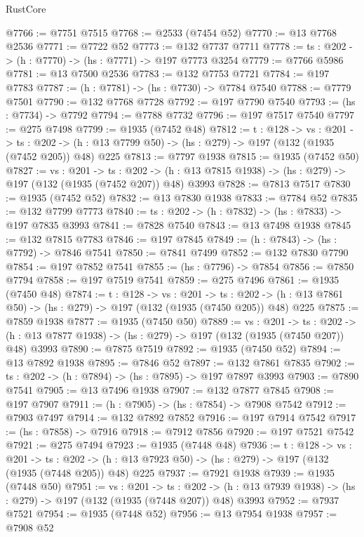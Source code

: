 \begin{lexlean}{RustCore}
\begin{coremodule}
@7766 := @7751 @7515
@7768 := @2533 (@7454 @52)
@7770 := @13 @7768 @2536
@7771 := @7722 @52
@7773 := @132 @7737 @7711
@7778 := {ts : @202} -> (h : @7770) -> (hs : @7771) -> @197 @7773 @3254
@7779 := @7766 @5986
@7781 := @13 @7500 @2536
@7783 := @132 @7753 @7721
@7784 := @197 @7783
@7787 := (h : @7781) -> (hs : @7730) -> @7784 @7540
@7788 := @7779 @7501
@7790 := @132 @7768 @7728
@7792 := @197 @7790 @7540
@7793 := (hs : @7734) -> @7792
@7794 := @7788 @7732
@7796 := @197 @7517 @7540
@7797 := @275 @7498
@7799 := @1935 (@7452 @48)
@7812 := {t : @128} ->
  {vs : @201} ->
  {ts : @202} -> (h : @13 @7799 @50) -> (hs : @279) -> @197 (@132 (@1935 (@7452 @205)) @48) @225
@7813 := @7797 @1938
@7815 := @1935 (@7452 @50)
@7827 := {vs : @201} ->
  {ts : @202} -> (h : @13 @7815 @1938) -> (hs : @279) -> @197 (@132 (@1935 (@7452 @207)) @48) @3993
@7828 := @7813 @7517
@7830 := @1935 (@7452 @52)
@7832 := @13 @7830 @1938
@7833 := @7784 @52
@7835 := @132 @7799 @7773
@7840 := {ts : @202} -> (h : @7832) -> (hs : @7833) -> @197 @7835 @3993
@7841 := @7828 @7540
@7843 := @13 @7498 @1938
@7845 := @132 @7815 @7783
@7846 := @197 @7845
@7849 := (h : @7843) -> (hs : @7792) -> @7846 @7541
@7850 := @7841 @7499
@7852 := @132 @7830 @7790
@7854 := @197 @7852 @7541
@7855 := (hs : @7796) -> @7854
@7856 := @7850 @7794
@7858 := @197 @7519 @7541
@7859 := @275 @7496
@7861 := @1935 (@7450 @48)
@7874 := {t : @128} ->
  {vs : @201} ->
  {ts : @202} -> (h : @13 @7861 @50) -> (hs : @279) -> @197 (@132 (@1935 (@7450 @205)) @48) @225
@7875 := @7859 @1938
@7877 := @1935 (@7450 @50)
@7889 := {vs : @201} ->
  {ts : @202} -> (h : @13 @7877 @1938) -> (hs : @279) -> @197 (@132 (@1935 (@7450 @207)) @48) @3993
@7890 := @7875 @7519
@7892 := @1935 (@7450 @52)
@7894 := @13 @7892 @1938
@7895 := @7846 @52
@7897 := @132 @7861 @7835
@7902 := {ts : @202} -> (h : @7894) -> (hs : @7895) -> @197 @7897 @3993
@7903 := @7890 @7541
@7905 := @13 @7496 @1938
@7907 := @132 @7877 @7845
@7908 := @197 @7907
@7911 := (h : @7905) -> (hs : @7854) -> @7908 @7542
@7912 := @7903 @7497
@7914 := @132 @7892 @7852
@7916 := @197 @7914 @7542
@7917 := (hs : @7858) -> @7916
@7918 := @7912 @7856
@7920 := @197 @7521 @7542
@7921 := @275 @7494
@7923 := @1935 (@7448 @48)
@7936 := {t : @128} ->
  {vs : @201} ->
  {ts : @202} -> (h : @13 @7923 @50) -> (hs : @279) -> @197 (@132 (@1935 (@7448 @205)) @48) @225
@7937 := @7921 @1938
@7939 := @1935 (@7448 @50)
@7951 := {vs : @201} ->
  {ts : @202} -> (h : @13 @7939 @1938) -> (hs : @279) -> @197 (@132 (@1935 (@7448 @207)) @48) @3993
@7952 := @7937 @7521
@7954 := @1935 (@7448 @52)
@7956 := @13 @7954 @1938
@7957 := @7908 @52

\end{coremodule}
\end{lexlean}
